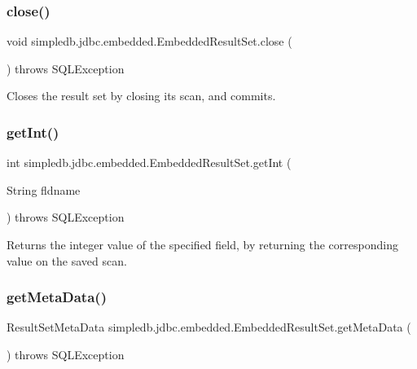 \subsubsection{\texorpdfstring{close()}{close()}}
{\footnotesize\ttfamily void simpledb.\+jdbc.\+embedded.\+Embedded\+Result\+Set.\+close (\begin{DoxyParamCaption}{ }\end{DoxyParamCaption}) throws S\+Q\+L\+Exception\hspace{0.3cm}{\ttfamily [inline]}}

Closes the result set by closing its scan, and commits. \mbox{\label{classsimpledb_1_1jdbc_1_1embedded_1_1EmbeddedResultSet_a00652d799b354e50aa01f2a6c9b517ac}} 
\subsubsection{\texorpdfstring{get\+Int()}{getInt()}}
{\footnotesize\ttfamily int simpledb.\+jdbc.\+embedded.\+Embedded\+Result\+Set.\+get\+Int (\begin{DoxyParamCaption}\item[{String}]{fldname }\end{DoxyParamCaption}) throws S\+Q\+L\+Exception\hspace{0.3cm}{\ttfamily [inline]}}

Returns the integer value of the specified field, by returning the corresponding value on the saved scan. \mbox{\label{classsimpledb_1_1jdbc_1_1embedded_1_1EmbeddedResultSet_ab48eda09a1aca7c9860716c28b5eb833}} 
\subsubsection{\texorpdfstring{get\+Meta\+Data()}{getMetaData()}}
{\footnotesize\ttfamily Result\+Set\+Meta\+Data simpledb.\+jdbc.\+embedded.\+Embedded\+Result\+Set.\+get\+Meta\+Data (\begin{DoxyParamCaption}{ }\end{DoxyParamCaption}) throws S\+Q\+L\+Exception\hspace{0.3cm}{\ttfamily [inline]}}

